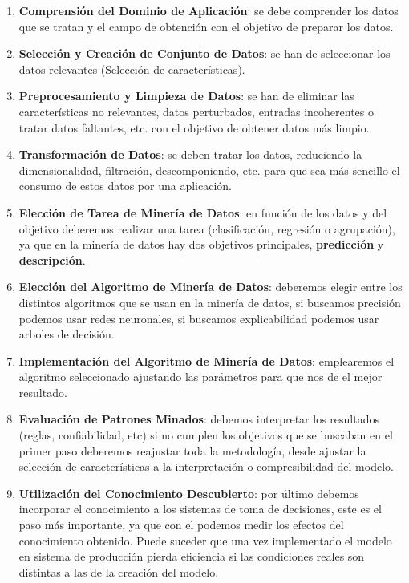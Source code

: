 \begin{enumerate}
    \item \textbf{Comprensión del Dominio de Aplicación}: se debe comprender los datos que se tratan y el campo de obtención con el objetivo de preparar los datos.
    \item \textbf{Selección y Creación de Conjunto de Datos}: se han de seleccionar los datos relevantes (Selección de características).
    \item \textbf{Preprocesamiento y Limpieza de Datos}: se han de eliminar las características no relevantes, datos perturbados, entradas incoherentes o tratar datos faltantes, etc. con el objetivo de obtener datos más limpio.
    \item \textbf{Transformación de Datos}: se deben tratar los datos, reduciendo la dimensionalidad, filtración, descomponiendo, etc. para que sea más sencillo el consumo de estos datos por una aplicación.
    \item \textbf{Elección de Tarea de Minería de Datos}: en función de los datos y del objetivo deberemos realizar una tarea (clasificación, regresión o agrupación), ya que en la minería de datos hay dos objetivos principales, \textbf{predicción} y \textbf{descripción}.
    \item \textbf{Elección del Algoritmo de Minería de Datos}: deberemos elegir entre los distintos algoritmos que se usan en la minería de datos, si buscamos precisión podemos usar redes neuronales, si buscamos explicabilidad podemos usar arboles de decisión.
    \item \textbf{Implementación del Algoritmo de Minería de Datos}: emplearemos el algoritmo seleccionado ajustando las parámetros para que nos de el mejor resultado.
    \item \textbf{Evaluación de Patrones Minados}: debemos interpretar los resultados (reglas, confiabilidad, etc) si no cumplen los objetivos que se buscaban en el primer paso deberemos reajustar toda la metodología, desde ajustar la selección de características a la interpretación o compresibilidad del modelo.
    \item \textbf{Utilización del Conocimiento Descubierto}: por último debemos incorporar el conocimiento a los sistemas de toma de decisiones, este es el paso más importante, ya que con el podemos medir los efectos del conocimiento obtenido. Puede suceder que una vez implementado el modelo en sistema de producción pierda eficiencia si las condiciones reales son distintas a las de la creación del modelo.
\end{enumerate}



